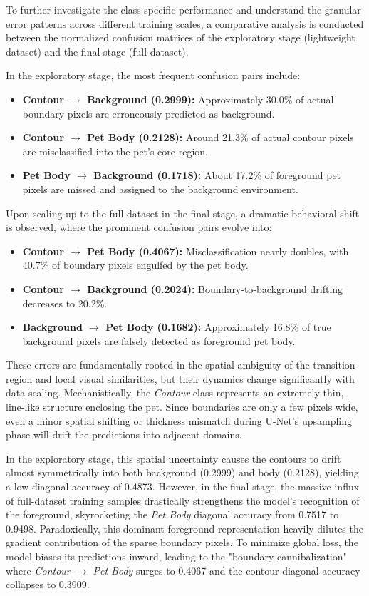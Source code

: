 To further investigate the class-specific performance and understand the granular error patterns across different training scales, a comparative analysis is conducted between the normalized confusion matrices of the exploratory stage (lightweight dataset) and the final stage (full dataset). 

In the exploratory stage, the most frequent confusion pairs include:
\begin{itemize}
    \item \textbf{Contour $\rightarrow$ Background (0.2999):} Approximately 30.0\% of actual boundary pixels are erroneously predicted as background.
    \item \textbf{Contour $\rightarrow$ Pet Body (0.2128):} Around 21.3\% of actual contour pixels are misclassified into the pet's core region.
    \item \textbf{Pet Body $\rightarrow$ Background (0.1718):} About 17.2\% of foreground pet pixels are missed and assigned to the background environment.
\end{itemize}

Upon scaling up to the full dataset in the final stage, a dramatic behavioral shift is observed, where the prominent confusion pairs evolve into:
\begin{itemize}
    \item \textbf{Contour $\rightarrow$ Pet Body (0.4067):} Misclassification nearly doubles, with 40.7\% of boundary pixels engulfed by the pet body.
    \item \textbf{Contour $\rightarrow$ Background (0.2024):} Boundary-to-background drifting decreases to 20.2\%.
    \item \textbf{Background $\rightarrow$ Pet Body (0.1682):} Approximately 16.8\% of true background pixels are falsely detected as foreground pet body.
\end{itemize}

These errors are fundamentally rooted in the spatial ambiguity of the transition region and local visual similarities, but their dynamics change significantly with data scaling. Mechanistically, the \textit{Contour} class represents an extremely thin, line-like structure enclosing the pet. Since boundaries are only a few pixels wide, even a minor spatial shifting or thickness mismatch during U-Net's upsampling phase will drift the predictions into adjacent domains. 

In the exploratory stage, this spatial uncertainty causes the contours to drift almost symmetrically into both background (0.2999) and body (0.2128), yielding a low diagonal accuracy of 0.4873. However, in the final stage, the massive influx of full-dataset training samples drastically strengthens the model's recognition of the foreground, skyrocketing the \textit{Pet Body} diagonal accuracy from 0.7517 to 0.9498. Paradoxically, this dominant foreground representation heavily dilutes the gradient contribution of the sparse boundary pixels. To minimize global loss, the model biases its predictions inward, leading to the "boundary cannibalization" where \textit{Contour $\rightarrow$ Pet Body} surges to 0.4067 and the contour diagonal accuracy collapses to 0.3909. 


